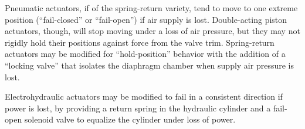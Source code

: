 \vskip 10pt

Pneumatic actuators, if of the spring-return variety, tend to move to one extreme position (``fail-closed'' or ``fail-open'') if air supply is lost.  Double-acting piston actuators, though, will stop moving under a loss of air pressure, but they may not rigidly hold their positions against force from the valve trim.  Spring-return actuators may be modified for ``hold-position'' behavior with the addition of a ``locking valve'' that isolates the diaphragm chamber when supply air pressure is lost.

\vskip 10pt

Electrohydraulic actuators may be modified to fail in a consistent direction if power is lost, by providing a return spring in the hydraulic cylinder and a fail-open solenoid valve to equalize the cylinder under loss of power.




